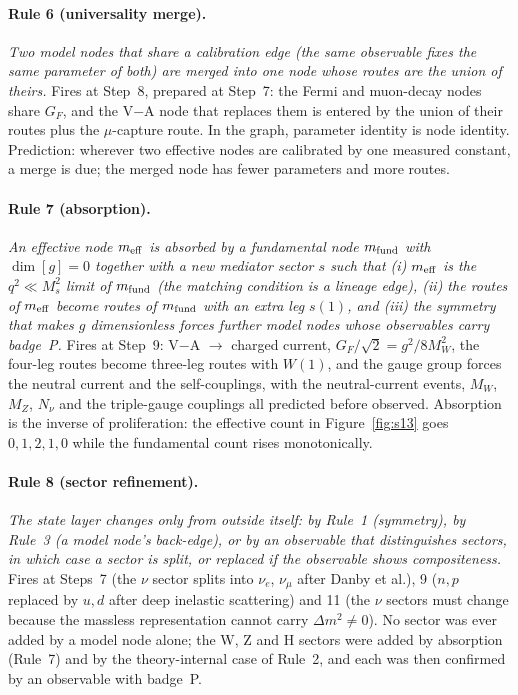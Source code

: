 \paragraph{Rule 6 (universality merge).} \emph{Two model nodes that share a calibration edge (the same observable fixes the same parameter of both) are merged into one node whose routes are the union of theirs.} Fires at Step~8, prepared at Step~7: the Fermi and muon-decay nodes share $G_F$, and the V$-$A node that replaces them is entered by the union of their routes plus the $\mu$-capture route. In the graph, parameter identity is node identity. Prediction: wherever two effective nodes are calibrated by one measured constant, a merge is due; the merged node has fewer parameters and more routes.

\paragraph{Rule 7 (absorption).} \emph{An effective node $m_{\rm eff}$ is absorbed by a fundamental node $m_{\rm fund}$ with $\dim[g]=0$ together with a new mediator sector $s$ such that (i) $m_{\rm eff}$ is the $q^2\ll M_s^2$ limit of $m_{\rm fund}$ (the matching condition is a lineage edge), (ii) the routes of $m_{\rm eff}$ become routes of $m_{\rm fund}$ with an extra leg $s(1)$, and (iii) the symmetry that makes $g$ dimensionless forces further model nodes whose observables carry badge~P.} Fires at Step~9: V$-$A $\to$ charged current, $G_F/\sqrt2=g^2/8M_W^2$, the four-leg routes become three-leg routes with $W(1)$, and the gauge group forces the neutral current and the self-couplings, with the neutral-current events, $M_W$, $M_Z$, $N_\nu$ and the triple-gauge couplings all predicted before observed. Absorption is the inverse of proliferation: the effective count in Figure~\ref{fig:s13} goes $0,1,2,1,0$ while the fundamental count rises monotonically.

\paragraph{Rule 8 (sector refinement).} \emph{The state layer changes only from outside itself: by Rule~1 (symmetry), by Rule~3 (a model node's back-edge), or by an observable that distinguishes sectors, in which case a sector is split, or replaced if the observable shows compositeness.} Fires at Steps~7 (the $\nu$ sector splits into $\nu_e$, $\nu_\mu$ after Danby et al.), 9 ($n,p$ replaced by $u,d$ after deep inelastic scattering) and 11 (the $\nu$ sectors must change because the massless representation cannot carry $\Delta m^2\neq0$). No sector was ever added by a model node alone; the W, Z and H sectors were added by absorption (Rule~7) and by the theory-internal case of Rule~2, and each was then confirmed by an observable with badge~P.

